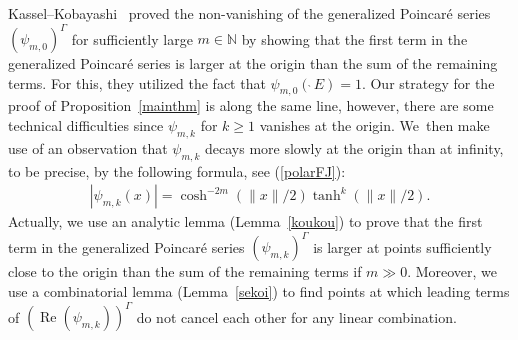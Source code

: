 \documentclass[10pt,a4paper]{amsart}
\numberwithin{equation}{section}
\begin{document}
Kassel--Kobayashi~\cite{KaKob16} proved the non-vanishing of
the generalized Poincar\'e series $(\psi_{m,0})^{\Gamma}$
for sufficiently large $m\in\mathbb{N}$
by showing that the first term in the generalized Poincar\'e series
is larger at the origin than the sum of the remaining terms.
For this, they utilized the fact that $\psi_{m,0}(\grave{\ }E)=1$.
Our strategy for the proof of Proposition~\ref{mainthm} is along the same line,
however, there are some technical difficulties
since $\psi_{m,k}$ for $k\geq1$ vanishes at the origin. We~then make use of an observation that
$\psi_{m,k}$ decays more slowly at the origin than at infinity,
to be precise, by the following formula, see (\ref{polarFJ}):
\begin{gather*}
|\psi_{m,k}(x)|=\cosh^{-2m}(\|x\|/2) \tanh^{k}(\|x\|/2).
\end{gather*}
Actually, we use an analytic lemma (Lemma~\ref{koukou})
to prove that the first term in the generalized Poincar\'e series $(\psi_{m,k})^{\Gamma}$
is larger at points sufficiently close to the origin
than the sum of the remaining terms if $m\gg0$.
Moreover,
we use a combinatorial lemma (Lemma~\ref{sekoi})
to find points at which
leading terms of
$(\operatorname{Re}(\psi_{m,k}))^{\Gamma}$
do not cancel each other for any linear combination.
\end{document}
